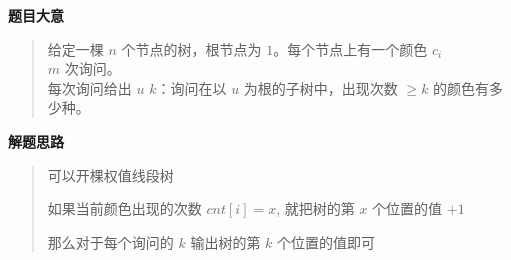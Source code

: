 \documentclass[E:/GsjzTle/main/main.tex]{subfiles}
\begin{document}
\textbf{题目大意}

\begin{quote}
给定一棵 \(n\) 个节点的树，根节点为 \(1\)。每个节点上有一个颜色 \(c_i\)
\\
\(m\) 次询问。\\
每次询问给出 \(u\) \(k\)：询问在以 \(u\) 为根的子树中，出现次数 \(≥k\)
的颜色有多少种。
\end{quote}

\textbf{解题思路}

\begin{quote}
可以开棵权值线段树

如果当前颜色出现的次数 \(cnt[i] = x\), 就把树的第 \(x\) 个位置的值
\(+ 1\)

那么对于每个询问的 \(k\) 输出树的第 \(k\) 个位置的值即可
\end{quote}
\end{document}
